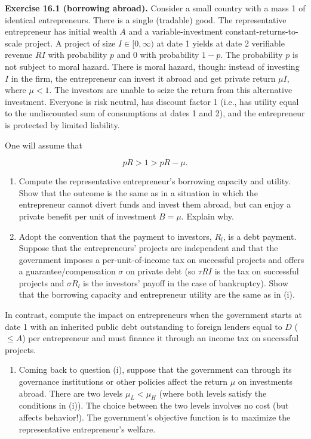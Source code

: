 \documentclass[11pt,a4paper]{article}
\providecommand{\tightlist}{\setlength{\itemsep}{0pt}\setlength{\parskip}{0pt}}
\begin{document}
\textbf{Exercise 16.1 (borrowing abroad).} Consider a small country with a mass 1 of identical
entrepreneurs. There is a single (tradable) good. The representative entrepreneur has initial wealth
\(A\) and a variable-investment constant-returns-to-scale project. A project of size
\(I \in [0, \infty)\) at date 1 yields at date 2 verifiable revenue \(RI\) with probability \(p\)
and 0 with probability \(1 - p\). The probability \(p\) is not subject to moral hazard. There is
moral hazard, though: instead of investing \(I\) in the firm, the entrepreneur can invest it abroad
and get private return \(\mu I\), where \(\mu < 1\). The investors are unable to seize the return
from this alternative investment. Everyone is risk neutral, has discount factor 1 (i.e., has utility
equal to the undiscounted sum of consumptions at dates 1 and 2), and the entrepreneur is protected
by limited liability.

One will assume that

\[pR > 1 > pR - \mu.\]

\begin{enumerate}
\def\labelenumi{(\roman{enumi})}
\item
  Compute the representative entrepreneur's borrowing capacity and utility. Show that the outcome is
  the same as in a situation in which the entrepreneur cannot divert funds and invest them abroad,
  but can enjoy a private benefit per unit of investment \(B = \mu\). Explain why.
\item
  Adopt the convention that the payment to investors, \(R_l\), is a debt payment. Suppose that the
  entrepreneurs' projects are independent and that the government imposes a per-unit-of-income tax
  on successful projects and offers a guarantee/compensation \(\sigma\) on private debt (so
  \(\tau RI\) is the tax on successful projects and \(\sigma R_l\) is the investors' payoff in the
  case of bankruptcy). Show that the borrowing capacity and entrepreneur utility are the same as in
  (i).
\end{enumerate}

In contrast, compute the impact on entrepreneurs when the government starts at date 1 with an
inherited public debt outstanding to foreign lenders equal to \(D\) (\(\leqslant A\)) per
entrepreneur and must finance it through an income tax on successful projects.

\begin{enumerate}
\def\labelenumi{(\roman{enumi})}
\setcounter{enumi}{2}
\tightlist
\item
  Coming back to question (i), suppose that the government can through its governance institutions
  or other policies affect the return \(\mu\) on investments abroad. There are two levels
  \(\mu_L < \mu_H\) (where both levels satisfy the conditions in (i)). The choice between the two
  levels involves no cost (but affects behavior!). The government's objective function is to
  maximize the representative entrepreneur's welfare.
\end{enumerate}
\end{document}
